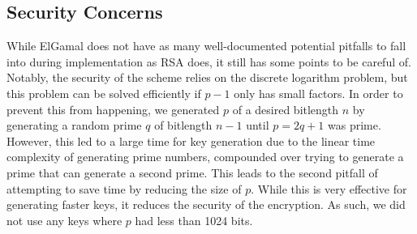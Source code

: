 	\subsection{Security Concerns}\label{sec:elgamal-security}
		While ElGamal does not have as many well-documented potential pitfalls to fall into during implementation as RSA does, it still has some points to be careful of. Notably, the security of the
		scheme relies on the discrete logarithm problem, but this problem can be solved efficiently if $p-1$ only has small factors. In order to prevent this from happening, we generated $p$ of a
		desired bitlength $n$ by generating a random prime $q$ of bitlength $n-1$ until $p=2q+1$ was prime. However, this led to a large time for key generation due to the linear time complexity
		of generating prime numbers, compounded over trying to generate a prime that can generate a second prime. This leads to the second pitfall of attempting to save time by reducing the
		size of $p$. While this is very effective for generating faster keys, it reduces the security of the encryption. As such, we did not use any keys where $p$ had less than 1024 bits.
